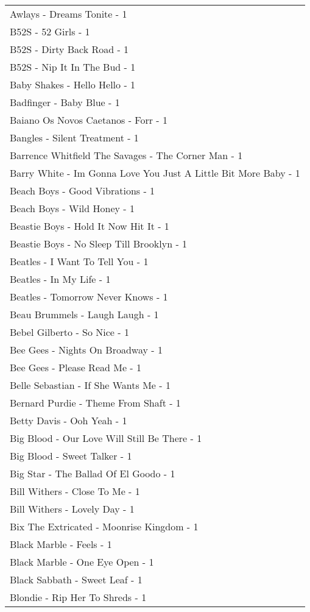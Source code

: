 \documentclass[
]{article}
\begin{document}
\begin{longtable}{l}
Awlays - Dreams Tonite - 1 \\ 
B52S - 52 Girls - 1 \\ 
B52S - Dirty Back Road - 1 \\ 
B52S - Nip It In The Bud - 1 \\ 
Baby Shakes - Hello Hello - 1 \\ 
Badfinger - Baby Blue - 1 \\ 
Baiano Os Novos Caetanos - Forr - 1 \\ 
Bangles - Silent Treatment - 1 \\ 
Barrence Whitfield The Savages - The Corner Man - 1 \\ 
Barry White - Im Gonna Love You Just A Little Bit More Baby - 1 \\ 
Beach Boys - Good Vibrations - 1 \\ 
Beach Boys - Wild Honey - 1 \\ 
Beastie Boys - Hold It Now Hit It - 1 \\ 
Beastie Boys - No Sleep Till Brooklyn - 1 \\ 
Beatles - I Want To Tell You - 1 \\ 
Beatles - In My Life - 1 \\ 
Beatles - Tomorrow Never Knows - 1 \\ 
Beau Brummels - Laugh Laugh - 1 \\ 
Bebel Gilberto - So Nice - 1 \\ 
Bee Gees - Nights On Broadway - 1 \\ 
Bee Gees - Please Read Me - 1 \\ 
Belle Sebastian - If She Wants Me - 1 \\ 
Bernard Purdie - Theme From Shaft - 1 \\ 
Betty Davis - Ooh Yeah - 1 \\ 
Big Blood - Our Love Will Still Be There - 1 \\ 
Big Blood - Sweet Talker - 1 \\ 
Big Star - The Ballad Of El Goodo - 1 \\ 
Bill Withers - Close To Me - 1 \\ 
Bill Withers - Lovely Day - 1 \\ 
Bix The Extricated - Moonrise Kingdom - 1 \\ 
Black Marble - Feels - 1 \\ 
Black Marble - One Eye Open - 1 \\ 
Black Sabbath - Sweet Leaf - 1 \\ 
Blondie - Rip Her To Shreds - 1 \\ 

\end{longtable}
\end{document}
